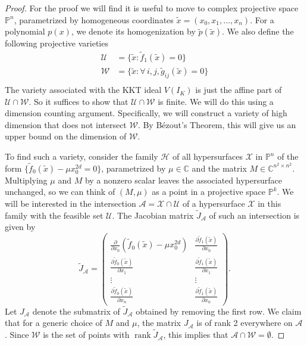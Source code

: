 \documentclass[aps,pra,notitlepage,preprintnumbers,11pt,tightenlines]{revtex4-1}
\renewcommand{\AA}{\mathcal{A}}
\newcommand{\bbC}{\mathbb{C}}
\newcommand{\HH}{\mathcal{H}}
\newcommand{\PP}{\mathbb{P}}
\newcommand{\UU}{\mathcal{U}}
\newcommand{\WW}{\mathcal{W}}
\newcommand{\XX}{\mathcal{X}}
\newcommand{\pd}{\partial}
\DeclareMathOperator{\rank}{rank}
\begin{document}
\begin{proof}
For the proof we will find it is useful to move to complex projective
space $\PP^n$,
parametrized by homogeneous coordinates $\tilde{x} = (x_0, x_1,
\dots, x_n)$.  For a polynomial $p(x)$, we denote its homogenization
by $\tilde{p}(\tilde{x})$. We also
define the following projective varieties
\begin{align*}
  \UU &= \{ \tilde x : \tilde{f}_1(\tilde{x}) = 0 \} \\
  \WW &= \{ \tilde x: \forall \, i, j, \tilde{g}_{ij}(\tilde x) = 0 \} \\
\end{align*}
The variety associated with the KKT ideal $V(I_K)$ is just the affine
part of $\UU \cap \WW$. So it suffices to show that $\UU \cap \WW$ is
finite. We will do this using a dimension counting
argument. Specifically, we will construct a variety of high dimension
that does not intersect $\WW$. By B\'{e}zout's Theorem, this will give us
an upper bound on the dimension of $\WW$.

To find such a variety, consider the
family $\HH$ of all hypersurfaces $\XX$ in $\PP^n$ of the form $\{ \tilde{f}_0(\tilde{x}) - \mu
x_0^{2d} = 0 \}$, parametrized by $\mu\in \bbC$ and the matrix
$M \in \bbC^{n^2 \times n^2}$. Multiplying
$\mu$ and $M$ by a nonzero scalar leaves the associated hypersurface
unchanged, so we can think of $(M, \mu)$ as a point in a projective
space $\PP^k$. We will be interested in the intersection $\AA = \XX
\cap \UU$ of a hypersurface $\XX$ in this family with the feasible set
$\UU$. The Jacobian
matrix $\tilde{J}_\AA$ of such an intersection is given by 
\[ \tilde{J}_\AA = \begin{pmatrix} \frac{\pd}{\pd x_0} (\tilde{f}_0(\tilde{x}) - \mu x_0^{2d}) & \frac{\pd
  \tilde{f}_1(\tilde{x})}{\pd x_0} \\
  \frac{\pd \tilde{f}_0(\tilde{x})}{\pd x_1} & \frac{ \pd \tilde{f}_1(\tilde{x})}{\pd x_1} \\
  \vdots & \vdots \\
  \frac{\pd \tilde{f}_0(\tilde{x})}{\pd x_n} & \frac{\pd \tilde{f}_1(\tilde{x})}{\pd x_n}
  \end{pmatrix}. \]
Let $J_\AA$
denote the submatrix of
$\tilde{J}_\AA$ obtained by removing the first row. We
claim that for a generic choice of $M$ and $\mu$, the matrix $J_\AA$
is of rank 2 everywhere on $\AA$. Since $\WW$ is the set of points
with $\rank \tilde{J}_\AA$, this implies that $\AA \cap \WW = \emptyset$.


\end{proof}
\end{document}
